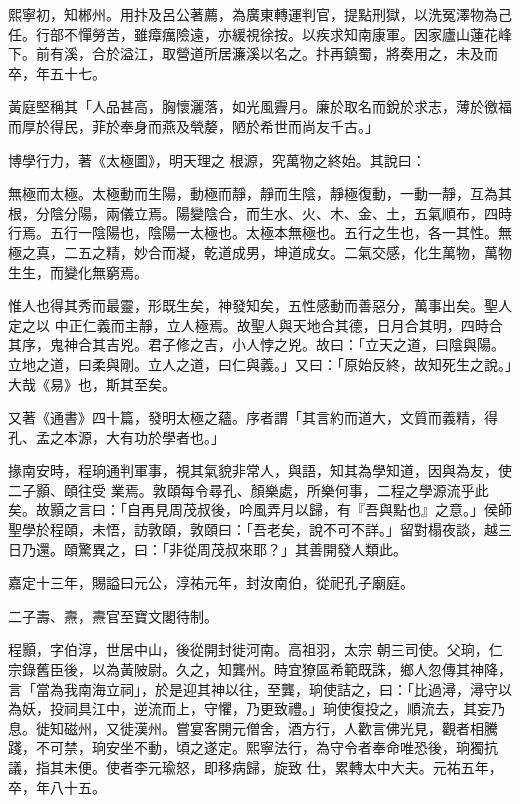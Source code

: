 \begin{pinyinscope}
 熙寧初，知郴州。用抃及呂公著薦，為廣東轉運判官，提點刑獄，以洗冤澤物為己任。行部不憚勞苦，雖瘴癘險遠，亦緩視徐按。以疾求知南康軍。因家廬山蓮花峰下。前有溪，合於溢江，取營道所居濂溪以名之。抃再鎮蜀，將奏用之，未及而卒，年五十七。



 黃庭堅稱其「人品甚高，胸懷灑落，如光風霽月。廉於取名而銳於求志，薄於徼福而厚於得民，菲於奉身而燕及煢嫠，陋於希世而尚友千古。」



 博學行力，著《太極圖》，明天理之
 根源，究萬物之終始。其說曰：



 無極而太極。太極動而生陽，動極而靜，靜而生陰，靜極復動，一動一靜，互為其根，分陰分陽，兩儀立焉。陽變陰合，而生水、火、木、金、土，五氣順布，四時行焉。五行一陰陽也，陰陽一太極也。太極本無極也。五行之生也，各一其性。無極之真，二五之精，妙合而凝，乾道成男，坤道成女。二氣交感，化生萬物，萬物生生，而變化無窮焉。



 惟人也得其秀而最靈，形既生矣，神發知矣，五性感動而善惡分，萬事出矣。聖人定之以
 中正仁義而主靜，立人極焉。故聖人與天地合其德，日月合其明，四時合其序，鬼神合其吉兇。君子修之吉，小人悖之兇。故曰：「立天之道，曰陰與陽。立地之道，曰柔與剛。立人之道，曰仁與義。」又曰：「原始反終，故知死生之說。」大哉《易》也，斯其至矣。



 又著《通書》四十篇，發明太極之蘊。序者謂「其言約而道大，文質而義精，得孔、孟之本源，大有功於學者也。」



 掾南安時，程珦通判軍事，視其氣貌非常人，與語，知其為學知道，因與為友，使二子顥、頤往受
 業焉。敦頤每令尋孔、顏樂處，所樂何事，二程之學源流乎此矣。故顥之言曰：「自再見周茂叔後，吟風弄月以歸，有『吾與點也』之意。」侯師聖學於程頤，未悟，訪敦頤，敦頤曰：「吾老矣，說不可不詳。」留對榻夜談，越三日乃還。頤驚異之，曰：「非從周茂叔來耶？」其善開發人類此。



 嘉定十三年，賜謚曰元公，淳祐元年，封汝南伯，從祀孔子廟庭。



 二子壽、燾，燾官至寶文閣待制。



 程顥，字伯淳，世居中山，後從開封徙河南。高祖羽，太宗
 朝三司使。父珦，仁宗錄舊臣後，以為黃陂尉。久之，知龔州。時宜獠區希範既誅，鄉人忽傳其神降，言「當為我南海立祠」，於是迎其神以往，至龔，珦使詰之，曰：「比過潯，潯守以為妖，投祠具江中，逆流而上，守懼，乃更致禮。」珦使復投之，順流去，其妄乃息。徙知磁州，又徙漢州。嘗宴客開元僧舍，酒方行，人歡言佛光見，觀者相騰踐，不可禁，珦安坐不動，頃之遂定。熙寧法行，為守令者奉命唯恐後，珦獨抗議，指其未便。使者李元瑜怒，即移病歸，旋致
 仕，累轉太中大夫。元祐五年，卒，年八十五。




\end{pinyinscope}
